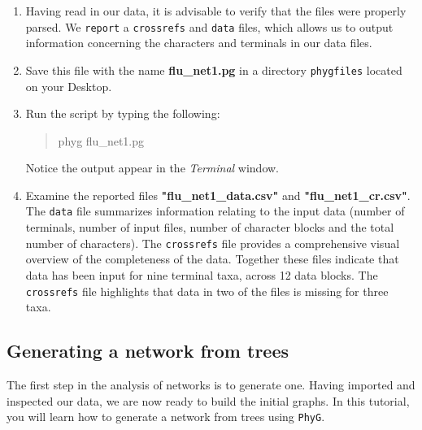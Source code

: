 \documentclass[11pt]{article}
\begin{document}
\begin{enumerate}
\item Having read in our data, it is advisable to verify that the files were properly 
parsed. We \texttt{report} a \texttt{crossrefs} and \texttt{data} files, which allows 
us to output information concerning the characters and terminals in our data files. 

\item Save this file with the name \textbf{flu\_net1.pg} in a directory \texttt{phygfiles} 
located on your Desktop.

\item Run the script by typing the following:

	\begin{quote}
  	phyg flu\_net1.pg
	\end{quote}

Notice the output appear in the \textit{Terminal} window.

\item Examine the reported files \textbf{"flu\_net1\_data.csv"} and 
\textbf{"flu\_net1\_cr.csv"}. The \texttt{data} file summarizes information relating 
to the input data (number of terminals, number of input files, number of character 
blocks and the total number of characters). The \texttt{crossrefs} file provides a 
comprehensive visual overview of the completeness of the data. Together these 
files indicate that data has been input for nine terminal taxa, across 12 data 
blocks. The \texttt{crossrefs} file highlights that data in two of the files is missing 
for three taxa.

\end{enumerate}

\subsection{Generating a network from trees}
\label{subsec:makinganetwork}

The first step in the analysis of networks is to generate one. Having imported and 
inspected our data, we are now ready to build the initial graphs. In this tutorial, you 
will learn how to generate a network from trees using \texttt{PhyG}. 
\end{document}
